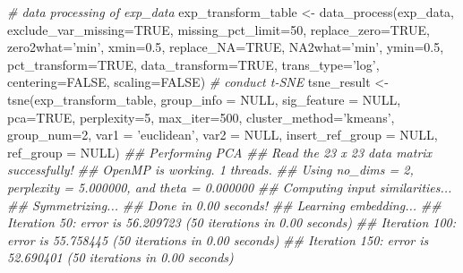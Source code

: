 \documentclass[]{article}
\newcommand{\hlnum}[1]{\textcolor[rgb]{0.816,0.125,0.439}{#1}}%
\newcommand{\hlstr}[1]{\textcolor[rgb]{0.251,0.627,0.251}{#1}}%
\newcommand{\hlcom}[1]{\textcolor[rgb]{0.502,0.502,0.502}{\textit{#1}}}%
\newcommand{\hlstd}[1]{\textcolor[rgb]{0.251,0.251,0.251}{#1}}%
\newcommand{\hlkwc}[1]{\textcolor[rgb]{0.251,0.251,0.251}{#1}}%
\newcommand{\hlkwd}[1]{\textcolor[rgb]{0.878,0.439,0.125}{#1}}%
\newenvironment{Shaded}{\begin{myshaded}}{\end{myshaded}}
\newcommand{\KeywordTok}[1]{\hlkwd{#1}}
\newcommand{\DataTypeTok}[1]{\hlkwc{#1}}
\newcommand{\DecValTok}[1]{\hlnum{#1}}
\newcommand{\FloatTok}[1]{\hlnum{#1}}
\newcommand{\StringTok}[1]{\hlstr{#1}}
\newcommand{\CommentTok}[1]{\hlcom{#1}}
\newcommand{\OtherTok}[1]{{#1}}
\newcommand{\NormalTok}[1]{\hlstd{#1}}
\begin{document}
\begin{Shaded}
\begin{Highlighting}[]
\CommentTok{# data processing of exp_data}
\NormalTok{exp_transform_table <-}\StringTok{ }\KeywordTok{data_process}\NormalTok{(exp_data, }\DataTypeTok{exclude_var_missing=}\OtherTok{TRUE}\NormalTok{,}
                                    \DataTypeTok{missing_pct_limit=}\DecValTok{50}\NormalTok{, }
                                    \DataTypeTok{replace_zero=}\OtherTok{TRUE}\NormalTok{, }\DataTypeTok{zero2what=}\StringTok{'min'}\NormalTok{, }
                                    \DataTypeTok{xmin=}\FloatTok{0.5}\NormalTok{, }\DataTypeTok{replace_NA=}\OtherTok{TRUE}\NormalTok{,}
                                    \DataTypeTok{NA2what=}\StringTok{'min'}\NormalTok{, }\DataTypeTok{ymin=}\FloatTok{0.5}\NormalTok{, }
                                    \DataTypeTok{pct_transform=}\OtherTok{TRUE}\NormalTok{,}
                                    \DataTypeTok{data_transform=}\OtherTok{TRUE}\NormalTok{, }\DataTypeTok{trans_type=}\StringTok{'log'}\NormalTok{,}
                                    \DataTypeTok{centering=}\OtherTok{FALSE}\NormalTok{, }\DataTypeTok{scaling=}\OtherTok{FALSE}\NormalTok{)}
\CommentTok{# conduct t-SNE}
\NormalTok{tsne_result <-}\StringTok{ }\KeywordTok{tsne}\NormalTok{(exp_transform_table, }\DataTypeTok{group_info =} \OtherTok{NULL}\NormalTok{,}
                    \DataTypeTok{sig_feature =} \OtherTok{NULL}\NormalTok{, }\DataTypeTok{pca=}\OtherTok{TRUE}\NormalTok{, }\DataTypeTok{perplexity=}\DecValTok{5}\NormalTok{,}
                    \DataTypeTok{max_iter=}\DecValTok{500}\NormalTok{, }\DataTypeTok{cluster_method=}\StringTok{'kmeans'}\NormalTok{,}
                    \DataTypeTok{group_num=}\DecValTok{2}\NormalTok{, }\DataTypeTok{var1 =} \StringTok{'euclidean'}\NormalTok{, }\DataTypeTok{var2 =} \OtherTok{NULL}\NormalTok{,}
                    \DataTypeTok{insert_ref_group =} \OtherTok{NULL}\NormalTok{, }\DataTypeTok{ref_group =} \OtherTok{NULL}\NormalTok{)}
\CommentTok{## Performing PCA}
\CommentTok{## Read the 23 x 23 data matrix successfully!}
\CommentTok{## OpenMP is working. 1 threads.}
\CommentTok{## Using no_dims = 2, perplexity = 5.000000, and theta = 0.000000}
\CommentTok{## Computing input similarities...}
\CommentTok{## Symmetrizing...}
\CommentTok{## Done in 0.00 seconds!}
\CommentTok{## Learning embedding...}
\CommentTok{## Iteration 50: error is 56.209723 (50 iterations in 0.00 seconds)}
\CommentTok{## Iteration 100: error is 55.758445 (50 iterations in 0.00 seconds)}
\CommentTok{## Iteration 150: error is 52.690401 (50 iterations in 0.00 seconds)}

\end{Highlighting}
\end{Shaded}
\end{document}

